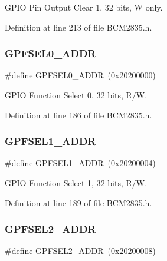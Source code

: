 G\+P\+IO Pin Output Clear 1, 32 bits, W only. 



Definition at line 213 of file B\+C\+M2835.\+h.

\mbox{\label{group__GPIO_ga0c3df699cdf9e7fae6f2555192c53b94}} 
\subsubsection{\texorpdfstring{G\+P\+F\+S\+E\+L0\+\_\+\+A\+D\+DR}{GPFSEL0\_ADDR}}
{\footnotesize\ttfamily \#define G\+P\+F\+S\+E\+L0\+\_\+\+A\+D\+DR~(0x20200000)}



G\+P\+IO Function Select 0, 32 bits, R/W. 



Definition at line 186 of file B\+C\+M2835.\+h.

\mbox{\label{group__GPIO_ga1e43ad10c82761bf4a40d368efc4dbe4}} 
\subsubsection{\texorpdfstring{G\+P\+F\+S\+E\+L1\+\_\+\+A\+D\+DR}{GPFSEL1\_ADDR}}
{\footnotesize\ttfamily \#define G\+P\+F\+S\+E\+L1\+\_\+\+A\+D\+DR~(0x20200004)}



G\+P\+IO Function Select 1, 32 bits, R/W. 



Definition at line 189 of file B\+C\+M2835.\+h.

\mbox{\label{group__GPIO_gaae4e338408363b99970dbb5ca4f525f2}} 
\subsubsection{\texorpdfstring{G\+P\+F\+S\+E\+L2\+\_\+\+A\+D\+DR}{GPFSEL2\_ADDR}}
{\footnotesize\ttfamily \#define G\+P\+F\+S\+E\+L2\+\_\+\+A\+D\+DR~(0x20200008)}



